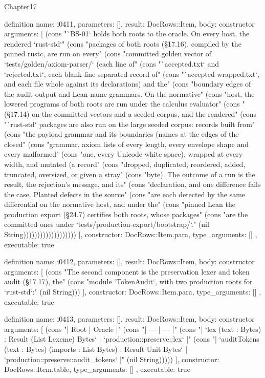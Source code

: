\begin{lexlean}{Chapter17}
\begin{semanticmodule}
definition{
  name: i0411,
  parameters: [],
  result: DocRows::Item,
  body: constructor{
    arguments: [
      (cons "`BS-01` holds both roots to the oracle. On every host, the rendered `rust-std`" (cons "packages of both roots (§17.16), compiled by the pinned rustc, are run on every" (cons "committed golden vector of `tests/golden/axiom-parser/` (each line of" (cons "`accepted.txt` and `rejected.txt`, each blank-line separated record of" (cons "`accepted-wrapped.txt`, and each file whole against its declarations) and the" (cons "boundary edges of the audit-output and Lean-name grammars. On the normative" (cons "host, the lowered programs of both roots are run under the calculus evaluator" (cons "(§17.14) on the committed vectors and a seeded corpus, and the rendered" (cons "`rust-std` packages are also run on the large seeded corpus: records built from" (cons "the payload grammar and its boundaries (names at the edges of the closed" (cons "grammar, axiom lists of every length, every envelope shape and every malformed" (cons "one, every Unicode white space), wrapped at every width, and mutated (a record" (cons "dropped, duplicated, reordered, added, truncated, oversized, or given a stray" (cons "byte). The outcome of a run is the result, the rejection's message, and its" (cons "declaration, and one difference fails the case. Planted defects in the source" (cons "are each detected by the same differential on the normative host, and under the" (cons "pinned Lean the production export (§24.7) certifies both roots, whose packages" (cons "are the committed ones under `tests/production-export/bootstrap/`." (nil String)))))))))))))))))))
    ],
    constructor: DocRows::Item.para,
    type_arguments: []
  },
  executable: true
}

definition{
  name: i0412,
  parameters: [],
  result: DocRows::Item,
  body: constructor{
    arguments: [
      (cons "The second component is the preservation lexer and token audit (§17.17), the" (cons "module `TokenAudit`, with two production roots for `rust-std`:" (nil String)))
    ],
    constructor: DocRows::Item.para,
    type_arguments: []
  },
  executable: true
}

definition{
  name: i0413,
  parameters: [],
  result: DocRows::Item,
  body: constructor{
    arguments: [
      (cons "| Root | Oracle |" (cons "| --- | --- |" (cons "| `lex (text : Bytes) : Result (List Lexeme) Bytes` | `production::preserve::lex` |" (cons "| `auditTokens (text : Bytes) (imports : List Bytes) : Result Unit Bytes` | `production::preserve::audit_tokens` |" (nil String)))))
    ],
    constructor: DocRows::Item.table,
    type_arguments: []
  },
  executable: true
}


\end{semanticmodule}
\end{lexlean}
